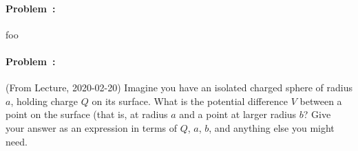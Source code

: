 \documentclass[12pt]{article}
\begin{document}
\vfill
\paragraph{Problem~\theproblem:}%
foo

\vfill
\paragraph{Problem~\theproblem:}%
(From Lecture, 2020-02-20)
Imagine you have an isolated charged sphere of radius $a$, holding
charge $Q$ on its surface.
What is the potential difference $V$ between a point on the surface (that
is, at radius $a$ and a point at larger radius $b$?
Give your answer as an expression in terms of $Q$, $a$, $b$, and
anything else you might need.

\vfill ~
\end{document}
